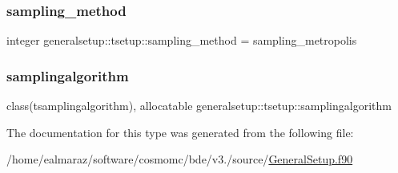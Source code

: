 \mbox{\label{structgeneralsetup_1_1tsetup_a725c9db92f823aa7352f2cc7a214e731}} 
\subsubsection{\texorpdfstring{sampling\+\_\+method}{sampling\_method}}
{\footnotesize\ttfamily integer generalsetup\+::tsetup\+::sampling\+\_\+method = sampling\+\_\+metropolis}

\mbox{\label{structgeneralsetup_1_1tsetup_a646d2a8444a296a5cc35c1bce832b3ba}} 
\subsubsection{\texorpdfstring{samplingalgorithm}{samplingalgorithm}}
{\footnotesize\ttfamily class(tsamplingalgorithm), allocatable generalsetup\+::tsetup\+::samplingalgorithm}



The documentation for this type was generated from the following file\+:\begin{DoxyCompactItemize}
\item 
/home/ealmaraz/software/cosmomc/bde/v3./source/\mbox{\hyperlink{GeneralSetup_8f90}{General\+Setup.\+f90}}\end{DoxyCompactItemize}

